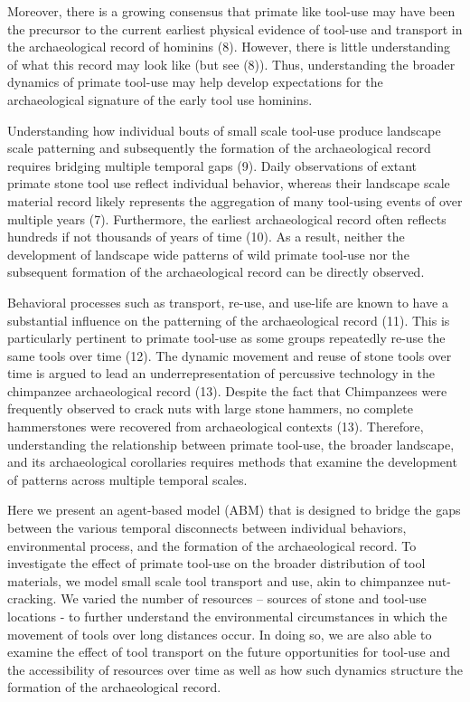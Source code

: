 \documentclass[9pt,twocolumn,twoside,]{pnas-new}
\begin{document}
Moreover, there is a growing consensus that primate like tool-use may
have been the precursor to the current earliest physical evidence of
tool-use and transport in the archaeological record of hominins (8).
However, there is little understanding of what this record may look like
(but see (8)). Thus, understanding the broader dynamics of primate
tool-use may help develop expectations for the archaeological signature
of the early tool use hominins.

Understanding how individual bouts of small scale tool-use produce
landscape scale patterning and subsequently the formation of the
archaeological record requires bridging multiple temporal gaps (9).
Daily observations of extant primate stone tool use reflect individual
behavior, whereas their landscape scale material record likely
represents the aggregation of many tool-using events of over multiple
years (7). Furthermore, the earliest archaeological record often
reflects hundreds if not thousands of years of time (10). As a result,
neither the development of landscape wide patterns of wild primate
tool-use nor the subsequent formation of the archaeological record can
be directly observed.

Behavioral processes such as transport, re-use, and use-life are known
to have a substantial influence on the patterning of the archaeological
record (11). This is particularly pertinent to primate tool-use as some
groups repeatedly re-use the same tools over time (12). The dynamic
movement and reuse of stone tools over time is argued to lead an
underrepresentation of percussive technology in the chimpanzee
archaeological record (13). Despite the fact that Chimpanzees were
frequently observed to crack nuts with large stone hammers, no complete
hammerstones were recovered from archaeological contexts (13).
Therefore, understanding the relationship between primate tool-use, the
broader landscape, and its archaeological corollaries requires methods
that examine the development of patterns across multiple temporal
scales.

Here we present an agent-based model (ABM) that is designed to bridge
the gaps between the various temporal disconnects between individual
behaviors, environmental process, and the formation of the
archaeological record. To investigate the effect of primate tool-use on
the broader distribution of tool materials, we model small scale tool
transport and use, akin to chimpanzee nut-cracking. We varied the number
of resources -- sources of stone and tool-use locations - to further
understand the environmental circumstances in which the movement of
tools over long distances occur. In doing so, we are also able to
examine the effect of tool transport on the future opportunities for
tool-use and the accessibility of resources over time as well as how
such dynamics structure the formation of the archaeological record.
\end{document}
